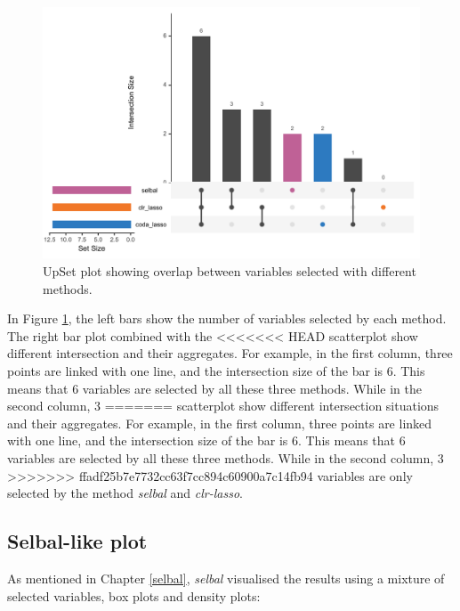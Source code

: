 \documentclass[openany]{book}
\begin{document}
\begin{figure}

{\centering \includegraphics[width=1\linewidth]{./Generated_plots/upsetCD-1} 

}

\caption{UpSet plot showing overlap between variables selected with different methods.}\label{fig:upsetCD}
\end{figure}

In Figure \ref{fig:upsetCD}, the left bars show the number of variables
selected by each method. The right bar plot combined with the
<<<<<<< HEAD
scatterplot show different intersection and their aggregates. For
example, in the first column, three points are linked with one line, and
the intersection size of the bar is 6. This means that 6 variables are
selected by all these three methods. While in the second column, 3
=======
scatterplot show different intersection situations and their aggregates.
For example, in the first column, three points are linked with one line,
and the intersection size of the bar is 6. This means that 6 variables
are selected by all these three methods. While in the second column, 3
>>>>>>> ffadf25b7e7732cc63f7cc894c60900a7c14fb94
variables are only selected by the method \emph{selbal} and
\emph{clr-lasso}.

\subsection{Selbal-like plot}\label{selbal-like-plot}

As mentioned in Chapter \ref{selbal}, \emph{selbal} visualised the
results using a mixture of selected variables, box plots and density
plots:
\end{document}
